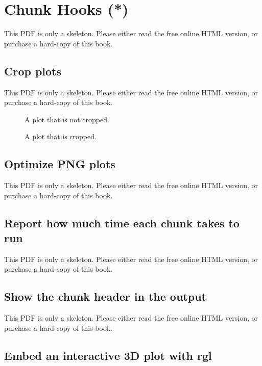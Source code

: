 \documentclass[
  11pt,
]{krantz}
\begin{document}
\chapter{Chunk Hooks (*)}\label{chunk-hooks}

This PDF is only a skeleton. Please either read the free online HTML version, or purchase a hard-copy of this book.

\section{Crop plots}\label{crop-plot}

This PDF is only a skeleton. Please either read the free online HTML version, or purchase a hard-copy of this book.

\begin{figure}\caption{A plot that is not cropped.}\end{figure}

\begin{figure}\caption{A plot that is cropped.}\end{figure}

\section{Optimize PNG plots}\label{optipng}

This PDF is only a skeleton. Please either read the free online HTML version, or purchase a hard-copy of this book.

\section{Report how much time each chunk takes to run}\label{time-chunk}

This PDF is only a skeleton. Please either read the free online HTML version, or purchase a hard-copy of this book.

\section{Show the chunk header in the output}\label{show-header}

This PDF is only a skeleton. Please either read the free online HTML version, or purchase a hard-copy of this book.

\section{Embed an interactive 3D plot with rgl}\label{rgl-3d}
\end{document}
